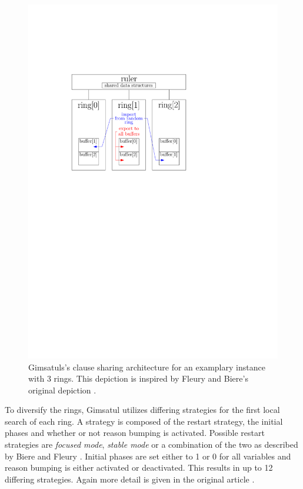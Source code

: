 \documentclass[12pt,a4paper,twoside]{scrartcl}
\numberwithin{equation}{section}
\begin{document}
\begin{figure}
  \center
  \includegraphics[]{figures/gimsatul_architecture.pdf}
  \caption{Gimsatuls's clause sharing architecture for an examplary instance with 3 rings. This depiction is inspired by Fleury and Biere's original depiction \cite{gimsatul}.}
  \label{fig:architectureGimsatul}
\end{figure}

To diversify the rings, Gimsatul utilizes differing strategies for the first local search of each ring. A strategy is composed of the restart strategy, the initial phases and whether or not reason bumping is activated. Possible restart strategies are \textit{focused mode}, \textit{stable mode} or a combination of the two as described by Biere and Fleury \cite{restartStrategy}. Initial phases are set either to 1 or 0 for all variables and reason bumping is either activated or deactivated. This results in up to 12 differing strategies. Again more detail is given in the original article \cite{gimsatul}.
\end{document}
